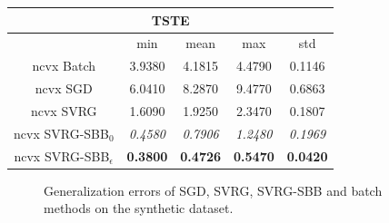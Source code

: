 \documentclass[letterpaper]{article} %
\begin{document}
{\begin{table}[tbh!]
{\begin{tabular}{c||cccc}
				\hline
				\multicolumn{5}{c}{TSTE} \\ \hline\hline
				                    & min     & mean   & max     & std    \\ \hline
				ncvx Batch    & 3.9380  & 4.1815 & 4.4790  & 0.1146 \\ \hline
				ncvx SGD      & 6.0410  & 8.2870 & 9.4770  & 0.6863 \\ \hline
				ncvx SVRG     & 1.6090  & 1.9250 & 2.3470  & 0.1807 \\ \hline
				ncvx SVRG-SBB$_0$  & \textit{0.4580}  & \textit{0.7906} & \textit{1.2480}  & \textit{0.1969} \\ \hline
				ncvx SVRG-SBB$_\epsilon$ & \textbf{0.3800}  & \textbf{0.4726} & \textbf{0.5470}  & \textbf{0.0420} \\
				\hline
			\end{tabular}
		}
		\label{tabl:1}
	\end{table}
}

\begin{figure}[thb!]
	\centering
	\caption{Generalization errors of SGD, SVRG,  SVRG-SBB and batch methods on the synthetic dataset.}
	\label{fig:synthetic}
\end{figure}
\end{document}
